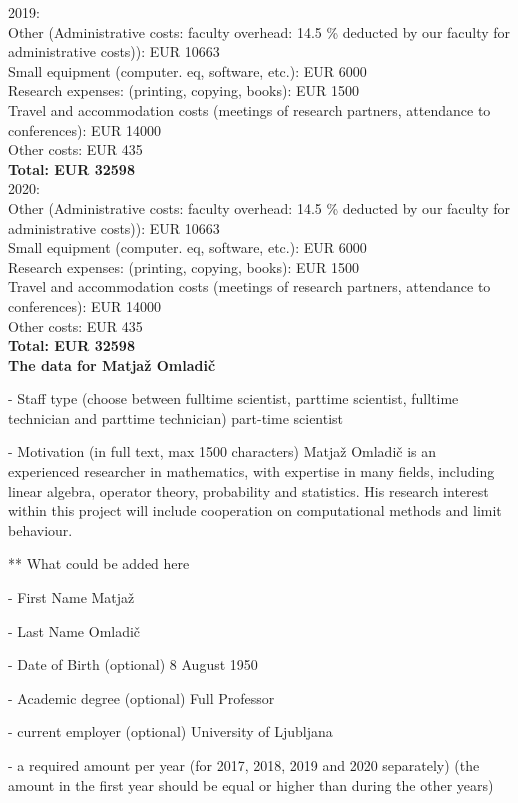 \documentclass[11pt,dvipsnames,usenames,a4paper]{article}
\begin{document}
2019: \\
Other (Administrative costs: faculty overhead: 14.5 \% deducted by our faculty for administrative costs)): EUR 10663 \\
Small equipment (computer. eq, software, etc.): EUR 6000 \\
Research expenses: (printing, copying, books): EUR 1500 \\
Travel and accommodation costs (meetings of research partners, attendance to conferences): EUR 14000  \\
Other costs: EUR 435 \\
\textbf{Total: EUR 32598} \\

2020: \\
Other (Administrative costs: faculty overhead: 14.5 \% deducted by our faculty for administrative costs)): EUR 10663 \\
Small equipment (computer. eq, software, etc.): EUR 6000 \\
Research expenses: (printing, copying, books): EUR 1500 \\
Travel and accommodation costs (meetings of research partners, attendance to conferences): EUR 14000  \\
Other costs: EUR 435 \\
\textbf{Total: EUR 32598} \\




{\bf\color{blue} The data for Matjaž Omladič}
	
- Staff type (choose between fulltime scientist, parttime scientist, fulltime technician and parttime technician)
part-time scientist

- Motivation (in full text, max 1500 characters)
Matjaž Omladič is an experienced researcher in mathematics, with expertise in many fields, including linear algebra, operator theory, probability and statistics. His research interest within this project will include cooperation on computational methods and limit behaviour. 

** What could be added here 

- First Name
Matjaž

- Last Name
Omladič

- Date of Birth (optional)
8 August 1950

- Academic degree (optional)
Full Professor

- current employer (optional)
University of Ljubljana

- a required amount per year (for 2017, 2018, 2019 and 2020 separately) (the amount in the first year should be equal or higher than during the other years)
\end{document}
